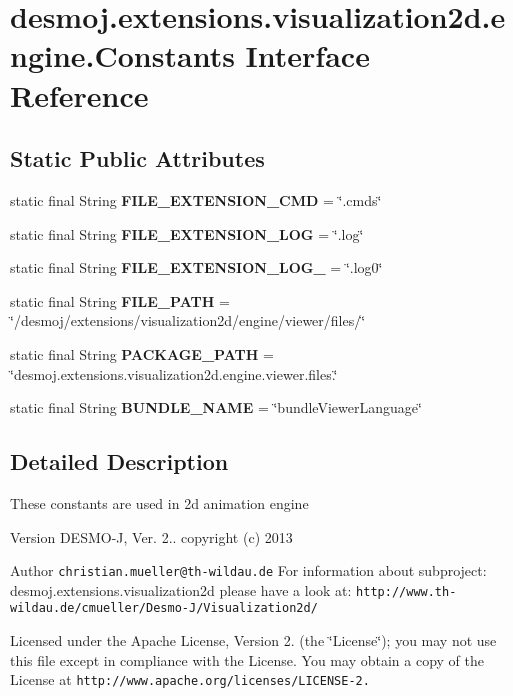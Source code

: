 \section{desmoj.\-extensions.\-visualization2d.\-engine.\-Constants Interface Reference}
\label{interfacedesmoj_1_1extensions_1_1visualization2d_1_1engine_1_1_constants}
\subsection*{Static Public Attributes}
\begin{DoxyCompactItemize}
\item 
static final String {\bf F\-I\-L\-E\-\_\-\-E\-X\-T\-E\-N\-S\-I\-O\-N\-\_\-\-C\-M\-D} = \char`\"{}.cmds\char`\"{}
\item 
static final String {\bf F\-I\-L\-E\-\_\-\-E\-X\-T\-E\-N\-S\-I\-O\-N\-\_\-\-L\-O\-G} = \char`\"{}.log\char`\"{}
\item 
static final String {\bf F\-I\-L\-E\-\_\-\-E\-X\-T\-E\-N\-S\-I\-O\-N\-\_\-\-L\-O\-G\-\_} = \char`\"{}.log0\char`\"{}
\item 
static final String {\bf F\-I\-L\-E\-\_\-\-P\-A\-T\-H} = \char`\"{}/desmoj/extensions/visualization2d/engine/viewer/files/\char`\"{}
\item 
static final String {\bf P\-A\-C\-K\-A\-G\-E\-\_\-\-P\-A\-T\-H} = \char`\"{}desmoj.\-extensions.\-visualization2d.\-engine.\-viewer.\-files.\char`\"{}
\item 
static final String {\bf B\-U\-N\-D\-L\-E\-\_\-\-N\-A\-M\-E} = \char`\"{}bundle\-Viewer\-Language\char`\"{}
\end{DoxyCompactItemize}


\subsection{Detailed Description}
These constants are used in 2d animation engine

\begin{DoxyVersion}{Version}
D\-E\-S\-M\-O-\/\-J, Ver. 2.. copyright (c) 2013 
\end{DoxyVersion}
\begin{DoxyAuthor}{Author}
{\tt christian.\-mueller@th-\/wildau.\-de} For information about subproject\-: desmoj.\-extensions.\-visualization2d please have a look at\-: {\tt http\-://www.\-th-\/wildau.\-de/cmueller/\-Desmo-\/\-J/\-Visualization2d/}
\end{DoxyAuthor}
Licensed under the Apache License, Version 2. (the \char`\"{}\-License\char`\"{}); you may not use this file except in compliance with the License. You may obtain a copy of the License at {\tt http\-://www.\-apache.\-org/licenses/\-L\-I\-C\-E\-N\-S\-E-\/2.}

